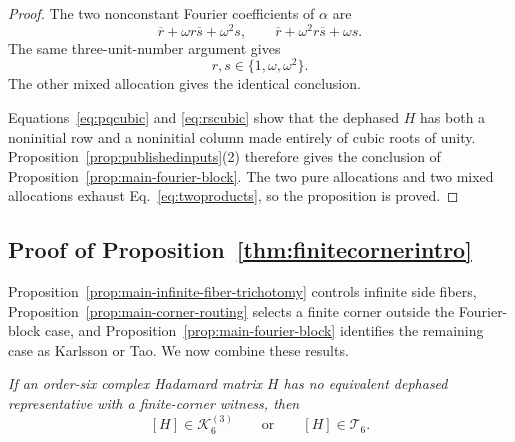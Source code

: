 \documentclass[aps,prx,reprint,nofootinbib,twoside,superscriptaddress,longbibliography,floatfix]{revtex4-2}
\theoremstyle{definition}
\newcommand{\KK}{\mathcal K}
\begin{document}
\begin{proof}
The two nonconstant Fourier coefficients of $\alpha$ are
\begin{equation}
\overline r+\omega r\overline s+\omega^2s,
\qquad
\overline r+\omega^2r\overline s+\omega s.
\label{eq:alphahatExplicit}
\end{equation}
The same three-unit-number argument gives
\begin{equation}
r,s\in\{1,\omega,\omega^2\}.
\label{eq:rscubic}
\end{equation}
The other mixed allocation gives the identical conclusion.

Equations~\eqref{eq:pqcubic} and \eqref{eq:rscubic} show that the dephased $H$ has both a noninitial row and a noninitial column made entirely of cubic roots of unity.  {Proposition~\ref{prop:publishedinputs}(2) therefore gives the conclusion of Proposition~\ref{prop:main-fourier-block}.} The two pure allocations and two mixed allocations exhaust Eq.~\eqref{eq:twoproducts}, so the proposition is proved.
\end{proof}

\subsection{{Proof of Proposition~\ref{thm:finitecornerintro}}}
\label{sec:directcompletion}
\label{sec:completion}

{Proposition~\ref{prop:main-infinite-fiber-trichotomy} controls infinite side fibers, Proposition~\ref{prop:main-corner-routing} selects a finite corner outside the Fourier-block case, and Proposition~\ref{prop:main-fourier-block} identifies the remaining case as Karlsson or Tao. We now combine these results.}

{\emph{If an order-six complex Hadamard matrix $H$ has no equivalent dephased representative with a finite-corner witness, then}}
\begin{equation}
{[H]\in\KK_6^{(3)}\qquad\text{or}\qquad[H]\in\mathcal T_6.}
\label{eq:supp-failed-search-routing}
\end{equation}
\end{document}

